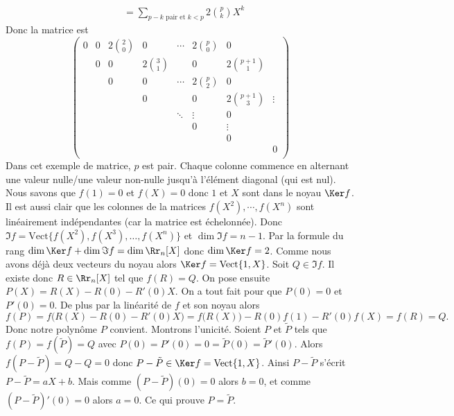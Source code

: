 {\begin{enumerate}
{\begin{align*}
 &= \sum_{p-k \text{ pair et } k<p} 2\binom{p}{k}X^k  
\end{align*}
Donc la matrice est 
$$\begin{pmatrix} 
0 & 0 & 2\binom{2}{0} & 0             & \cdots & 2\binom{p}{0} & 0               &        \\
  & 0 & 0             & 2\binom{3}{1} &        & 0             & 2\binom{p+1}{1} &        \\
  &   & 0             & 0             & \cdots & 2\binom{p}{2} & 0               &        \\
  &   &               & 0             &        & 0             & 2\binom{p+1}{3} & \vdots \\  
  &   &               &               & \ddots & \vdots        & 0               &        \\
  &   &               &               &        & 0             & \vdots          &        \\
  &   &               &               &        &               & 0               &        \\
  &   &               &               &        &               &                 & 0      \\
  \end{pmatrix}$$
Dans cet exemple de matrice, $p$ est pair.
Chaque colonne commence en alternant une valeur nulle/une valeur non-nulle 
jusqu'à l'élément diagonal (qui est nul).
Nous savons que $f(1)=0$ et $f(X)=0$ donc $1$ et $X$ sont dans le noyau $\Ker f$.
Il est aussi clair que les colonnes de la matrices $f(X^2),\cdots, f(X^n)$ sont linéairement indépendantes
(car la matrice est échelonnée). Donc $\Im f = \textrm{Vect}\{f(X^2),f(X^3),\ldots,f(X^n)\}$ 
et $\dim \Im f = n-1$.
Par la formule du rang $\dim \Ker f + \dim \Im f = \dim \Rr_n[X]$ donc
$\dim \Ker f = 2$. Comme nous avons déjà deux vecteurs du noyau alors 
$\Ker f =  \textrm{Vect}\{1,X\}$.
Soit $Q \in \Im f$. Il existe donc $R\in\Rr_n[X]$ tel que $f(R)=Q$.
On pose ensuite $P(X)=R(X)-R(0)-R'(0)X$.
On a tout fait pour que $P(0)=0$ et $P'(0)=0$.
De plus par la linéarité de $f$ et son noyau alors
$$f(P)= f\big( R(X)-R(0)-R'(0)X\big) = f\big( R(X)\big)-R(0)f(1) -R'(0)f(X)=f(R)=Q.$$
Donc notre polynôme $P$ convient.
Montrons l'unicité. Soient $P$ et $\tilde P$ tels que $f(P)=f(\tilde P)=Q$
avec $P(0)=P'(0)=0 = \tilde P(0)=\tilde P'(0)$.
Alors  $f(P-\tilde P) = Q-Q=0$ donc $P-\tilde P \in \Ker f = \textrm{Vect}\{1,X\}$.
Ainsi $P-\tilde P$ s'écrit $P-\tilde P = aX+b$. Mais comme $(P-\tilde P)(0)=0$ alors 
$b=0$, et comme  $(P-\tilde P)'(0)=0$ alors $a=0$. Ce qui prouve $P = \tilde P$.
}
\end{enumerate}
}
